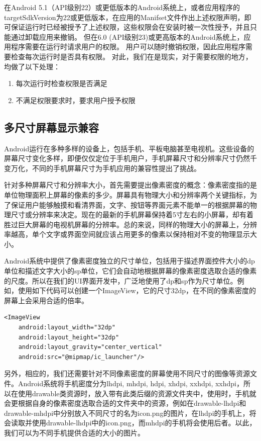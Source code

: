 \documentclass[format=final, language=chinese, degree=fyp]{hustthesis}
\begin{document}
在Android 5.1（API级别22）或更低版本的Android系统上，或者应用程序的targetSdkVersion为22或更低版本，在应用的Manifset文件作出上述权限声明，即可保证运行时已经被授予了上述权限，这些权限会在安装时被一次性授予，并且只能通过卸载应用来撤销。 但在6.0 (API级别23)或更高版本的Android系统上，应用程序需要在运行时请求用户的权限。 用户可以随时撤销权限，因此应用程序需要检查每次运行时是否具有权限。
对此，我们在是现实，对于需要权限的地方，均做了以下处理：
\begin{enumerate}
	\item 每次运行时检查权限是否满足
	\item 不满足权限要求时，要求用户授予权限
\end{enumerate}

\subsection{多尺寸屏幕显示兼容}


Android运行在多种多样的设备上，包括手机、平板电脑甚至电视机。这些设备的屏幕尺寸变化多样，即便仅仅定位于手机用户，手机屏幕尺寸和分辨率尺寸仍然千变万化，不同的手机屏幕尺寸为手机应用的兼容性提出了挑战。

针对多种屏幕尺寸和分辨率大小，首先需要提出像素密度的概念：像素密度指的是单位物理面积上屏幕的像素的多少。屏幕具有物理大小和分辨率两个关键指标，为了保证用户能够触摸和看清界面，文字、按钮等界面元素不能单一的根据屏幕的物理尺寸或分辨率来决定。现在的最新的手机屏幕保持着5寸左右的小屏幕，却有着胜过巨大屏幕的电视机屏幕的分辨率。总的来说，同样的物理大小的屏幕上，分辨率越高，单个文字或界面空间就应该占用更多的像素以保持相对不变的物理显示大小。

Android系统中提供了像素密度独立的尺寸单位，包括用于描述界面控件大小的dp单位和描述文字大小的sp单位，它们会自动地根据屏幕的像素密度选取合适的像素的尺度。所以在我们的UI界面开发中，广泛地使用了dp和sp作为尺寸单位。例如，使用如下代码可以创建一个ImageView，它的尺寸32dp，在不同的像素密度的屏幕上会采用合适的倍率。

\begin{lstlisting}
<ImageView
	android:layout_width="32dp"
	android:layout_height="32dp"
	android:layout_gravity="center_vertical"
	android:src="@mipmap/ic_launcher"/>
\end{lstlisting}

另外，相应的，我们还需要针对不同像素密度的屏幕使用不同尺寸的图像等资源文件。Android系统将手机密度分为lhdpi, mhdpi, hdpi, xhdpi, xxhdpi, xxhdpi，所以在使用drawable类资源时，放入带有此类后缀的资源文件夹中，使用时，手机就会更根据自身的像素密度选取合适的文件夹中的资源，例如在drawable-lhdpi和drawable-mhdpi中分别放入不同尺寸的名为icon.png的图片，在lhdpi的手机上，将会读取并使用drawable-lhdpi中的icon.png，而mhdpi的手机将会使用后者。以此，我们可以为不同手机提供合适的大小的图片。
\end{document}
